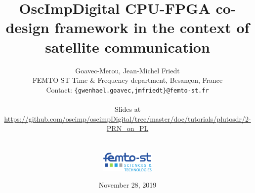 \documentclass[compress,10pt]{beamer}
\begin{document}
\date{November 28, 2019}
\author[G. Goavec- Merou \& al.]{Goavec-Merou, Jean-Michel Friedt\\
{\footnotesize
FEMTO-ST Time \& Frequency department, Besan\c con, France \\ 
}
Contact: {\tt \{gwenhael.goavec,jmfriedt\}@femto-st.fr} \\ \vspace{0.6cm}
\begin{center}
Slides at \\
\url{https://github.com/oscimp/oscimpDigital/tree/master/doc/tutorials/plutosdr/2-PRN_on_PL}\\\ \\ \ \\
\includegraphics[height=1cm]{logo_femto.pdf}\vspace{-1cm}
\end{center}
}
\title[]{OscImpDigital CPU-FPGA co-design framework in the context of satellite communication}

\begin{frame}
\titlepage
\end{frame}


\end{document}

